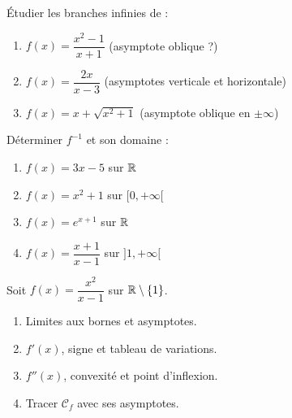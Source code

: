 \begin{exercice}[3 : Asymptotes]
  \'{E}tudier les branches infinies de :
  \begin{enumerate}
    \item $f(x) = \dfrac{x^2-1}{x+1}$ \quad (asymptote oblique ?)
    \item $f(x) = \dfrac{2x}{x-3}$ \quad (asymptotes verticale et horizontale)
    \item $f(x) = x + \sqrt{x^2+1}$ \quad (asymptote oblique en $\pm\infty$)
  \end{enumerate}
\end{exercice}

\begin{exercice}
  D\'{e}terminer $f^{-1}$ et son domaine :
  \begin{enumerate}
    \item $f(x) = 3x - 5$ sur $\mathbb{R}$
    \item $f(x) = x^2 + 1$ sur $[0,+\infty[$
    \item $f(x) = e^{x+1}$ sur $\mathbb{R}$
    \item $f(x) = \dfrac{x+1}{x-1}$ sur $]1,+\infty[$
  \end{enumerate}
\end{exercice}

\begin{exercice}
  Soit $f(x) = \dfrac{x^2}{x-1}$ sur $\mathbb{R}\setminus\{1\}$.
  \begin{enumerate}
    \item Limites aux bornes et asymptotes.
    \item $f'(x)$, signe et tableau de variations.
    \item $f''(x)$, convexit\'{e} et point d'inflexion.
    \item Tracer $\mathcal{C}_f$ avec ses asymptotes.
  \end{enumerate}
\end{exercice}